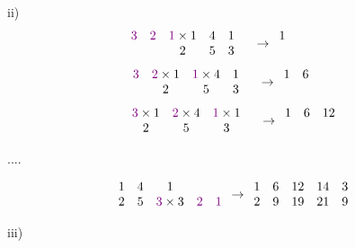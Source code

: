 \documentclass[11pt]{article}
\begin{document}
ii) \\ 

\[
\begin{array}{cccccccc}
    \textcolor{violet}{3}&\textcolor{violet}{2}&\textcolor{violet}{1} \times 1 & 4 & 1 \\ 
    & & 2 & 5 & 3 & \\ 
\end{array}
\rightarrow
\begin{array}{ccccc}
    1 &  &  & &  \\
     &  &  & &  \\
\end{array}
\]
\[
\begin{array}{cccccccc}
    &\textcolor{violet}{3}&\textcolor{violet}{2}\times 1&\textcolor{violet}{1} \times 4 & 1  \\ 
    & & 2 & 5 & 3 & \\ 
\end{array}
\rightarrow
\begin{array}{ccccc}
    1 & 6 &  & &  \\
     &  &  & &  \\
\end{array}
\]
\[
\begin{array}{cccccccc}
    &&\textcolor{violet}{3}\times 1&\textcolor{violet}{2}\times 4&\textcolor{violet}{1} \times 1  \\ 
    & & 2 & 5 & 3 & \\ 
\end{array}
\rightarrow
\begin{array}{ccccc}
    1 & 6 & 12 & &  \\
     &  &  & &  \\
\end{array}
\]
\begin{center}
    ....
\end{center} 
\[
\begin{array}{cccccccc}
    1 & 4 &1 \\
    2&5&\textcolor{violet}{3}\times 3&\textcolor{violet}{2}&\textcolor{violet}{1}  \\ 
\end{array}
\rightarrow
\begin{array}{ccccc}
    1 & 6 & 12 & 14& 3 \\
    2 & 9 & 19 & 21& 9 \\
\end{array}
\]

iii) \\ 
\end{document}
